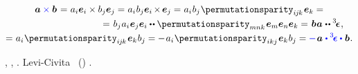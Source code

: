 \begin{multline}
\bm{a} \mathcolor{blue}{\times} \bm{b} \hspace{.2ex}
= \hspace{.1ex} a_i \bm{e}_i \times b_j \bm{e}_j
= \hspace{.1ex} a_i \hspace{.1ex} b_j \bm{e}_i \hspace{-0.2ex} \times \hspace{-0.2ex} \bm{e}_j
= \hspace{.1ex} a_i \hspace{.1ex} b_j \hspace{.1ex} \permutationsparity_{i\hspace{-0.1ex}j\hspace{-0.1ex}k} \hspace{.2ex} \bm{e}_k =
\\[-0.12em]
\shoveright{= \hspace{.2ex} b_j \hspace{.1ex} a_i \hspace{.1ex} \bm{e}_j \bm{e}_i \dotdotp \permutationsparity_{mnk} \hspace{.2ex} \bm{e}_m \bm{e}_n \bm{e}_k
= \hspace{.2ex} \bm{b} \hspace{.1ex} \bm{a} \hspace{.1ex} \dotdotp \permutationsparitytensor \hspace{.1ex} ,}
\\[-0.1em]
= \hspace{.1ex} a_i \hspace{.1ex} \permutationsparity_{i\hspace{-0.1ex}j\hspace{-0.1ex}k} \hspace{.2ex} \bm{e}_k \hspace{.1ex} b_j
= - \hspace{.2ex} a_i \hspace{.1ex} \permutationsparity_{ikj} \hspace{.2ex} \bm{e}_k \hspace{.1ex} b_j
= \mathcolor{blue}{-} \hspace{.2ex} \bm{a} \hspace{.1ex} \mathcolor{blue}{\dotp \permutationsparitytensor \dotp} \hspace{.12ex} \bm{b}
\hspace{.1ex} .
\end{multline}

\vspace{-0.1em}\noindent
{},   , .
  Levi\hbox{-}Civita   ~()    .

